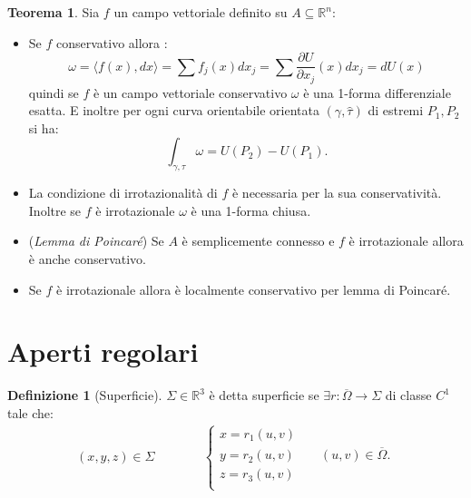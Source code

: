 \documentclass[leqno]{article}
\theoremstyle{definition}
\newtheorem{definition}{Definizione}[section]
\numberwithin{equation}{section}
\newtheorem{theorem}{Teorema}[section]
\theoremstyle{remark}
\begin{document}
	\begin{theorem}
		Sia $f$ un campo vettoriale definito su $A\subseteq\mathbb{R}^n$:
		\begin{itemize}
			\item Se $f$ conservativo allora :      \begin{equation}
				\omega=\langle f(x),dx\rangle= \sum f_j(x)dx_j=\sum \dfrac{\partial U}{\partial x_j}(x)dx_j=dU(x)
			\end{equation}
			quindi se $f$ è un campo vettoriale conservativo $\omega$ è una 1-forma differenziale esatta. E inoltre per ogni curva orientabile orientata $(\gamma,\hat{\tau})$ di estremi $P_1,P_2$ si ha: 
			\begin{equation}
				\int_{\gamma,\tau}\omega = U(P_2)-U(P_1).
			\end{equation}
			\item La condizione di irrotazionalità di $f$ è necessaria per la sua conservatività. Inoltre se $f$ è irrotazionale $\omega$ è una 1-forma chiusa. 
			\item (\textit{Lemma di Poincaré}) Se $A$ è semplicemente connesso e $f$ è irrotazionale allora è anche conservativo.
			\item Se $f$ è irrotazionale allora è localmente conservativo per lemma di Poincaré.
		\end{itemize}
		
	\end{theorem}
	\section{Aperti regolari}
	
	\begin{definition}[Superficie]
		$\Sigma\in\mathbb{R}^3$ è detta superficie se $\exists r :\overline{\Omega} \to \Sigma$ di classe $C^1$ tale che:
		\begin{equation}
			\begin{split}
				(x,y,z)\in \Sigma \quad \quad \quad 
			\end{split}
			\begin{split}
				\begin{cases}
					x=r_1(u,v)\\
					y=r_2(u,v) \quad \quad  (u,v)\in \overline{\Omega}.\\
					z=r_3(u,v)\\
				\end{cases}
			\end{split}    
		\end{equation}
	\end{definition}
	
\end{document}
